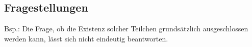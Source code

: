 \documentclass[../tephyna.tex]{subfiles}
\begin{document}
\subsection{Fragestellungen}
{
Bsp.: Die Frage, ob die Existenz solcher Teilchen grundsätzlich ausgeschlossen werden kann, lässt sich nicht eindeutig beantworten.
}
\end{document}
